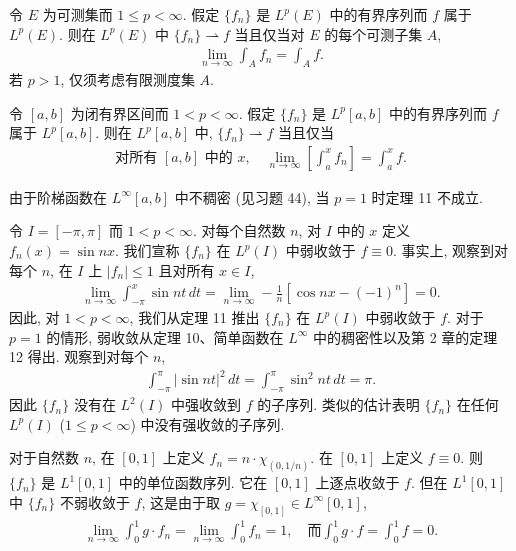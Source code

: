 \documentclass[../../main.tex]{subfiles}
\begin{document}
\begin{theorem}\label{theorem:ch08-特征函数判别}
令 $E$ 为可测集而 $1\leqslant p<\infty$. 假定 $\{f_{n}\}$ 是 $L^{p}(E)$ 中的有界序列而 $f$ 属于 $L^{p}(E)$. 则在 $L^{p}(E)$ 中 $\{f_{n}\}\rightharpoonup f$ 当且仅当对 $E$ 的每个可测子集 $A$,
\begin{align}
\lim_{n\to\infty}\int_{A}f_{n}=\int_{A}f.\label{align:ch08-特征函数判别}
\end{align}
若 $p>1$, 仅须考虑有限测度集 $A$.
\end{theorem}

\begin{theorem}\label{theorem:ch08-区间积分判别}
令 $[a,b]$ 为闭有界区间而 $1<p<\infty$. 假定 $\{f_{n}\}$ 是 $L^{p}[a,b]$ 中的有界序列而 $f$ 属于 $L^{p}[a,b]$. 则在 $L^{p}[a,b]$ 中, $\{f_{n}\}\rightharpoonup f$ 当且仅当
\begin{align}
\text{对所有 }[a,b]\text{ 中的 }x,\quad\lim_{n\to\infty}\left[\int_{a}^{x}f_{n}\right]=\int_{a}^{x}f.\label{align:ch08-区间积分判别}
\end{align}
\end{theorem}

由于阶梯函数在 $L^{\infty}[a,b]$ 中不稠密 (见习题 44), 当 $p=1$ 时定理 11 不成立.

\begin{example}\label{example:ch08-Riemann-Lebesgue}
令 $I=[-\pi,\pi]$ 而 $1<p<\infty$. 对每个自然数 $n$, 对 $I$ 中的 $x$ 定义 $f_{n}(x)=\sin nx$. 我们宣称 $\{f_{n}\}$ 在 $L^{p}(I)$ 中弱收敛于 $f\equiv 0$. 事实上, 观察到对每个 $n$, 在 $I$ 上 $|f_{n}|\leqslant 1$ 且对所有 $x\in I$,
\begin{align*}
\lim_{n\to\infty}\int_{-\pi}^{x}\sin nt\,dt=\lim_{n\to\infty}-\frac{1}{n}[\cos nx-(-1)^{n}]=0.
\end{align*}
因此, 对 $1<p<\infty$, 我们从定理 11 推出 $\{f_{n}\}$ 在 $L^{p}(I)$ 中弱收敛于 $f$. 对于 $p=1$ 的情形, 弱收敛从定理 10、简单函数在 $L^{\infty}$ 中的稠密性以及第 2 章的定理 12 得出. 观察到对每个 $n$,
\begin{align*}
\int_{-\pi}^{\pi}|\sin nt|^{2}\,dt=\int_{-\pi}^{\pi}\sin^{2}nt\,dt=\pi.
\end{align*}
因此 $\{f_{n}\}$ 没有在 $L^{2}(I)$ 中强收敛到 $f$ 的子序列. 类似的估计表明 $\{f_{n}\}$ 在任何 $L^{p}(I)$ ($1\leqslant p<\infty$) 中没有强收敛的子序列.
\end{example}

\begin{example}\label{example:ch08-逐点不弱收敛}
对于自然数 $n$, 在 $[0,1]$ 上定义 $f_{n}=n\cdot\chi_{(0,1/n)}$. 在 $[0,1]$ 上定义 $f\equiv 0$. 则 $\{f_{n}\}$ 是 $L^{1}[0,1]$ 中的单位函数序列. 它在 $[0,1]$ 上逐点收敛于 $f$. 但在 $L^{1}[0,1]$ 中 $\{f_{n}\}$ 不弱收敛于 $f$, 这是由于取 $g=\chi_{[0,1]}\in L^{\infty}[0,1]$,
\begin{align*}
\lim_{n\to\infty}\int_{0}^{1}g\cdot f_{n}=\lim_{n\to\infty}\int_{0}^{1}f_{n}=1,\quad\text{而}\int_{0}^{1}g\cdot f=\int_{0}^{1}f=0.
\end{align*}
\end{example}
\end{document}
